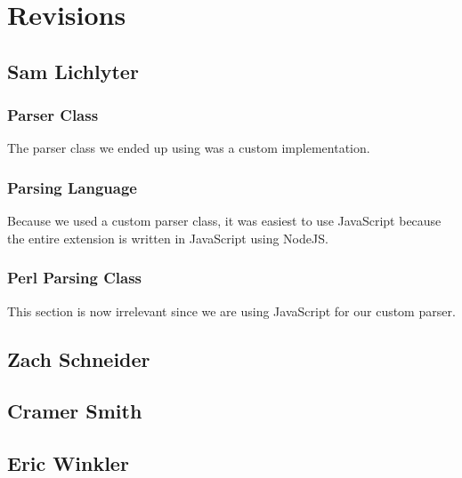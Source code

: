 \documentclass[letterpaper,10pt,titlepage,draftclsnofoot,onecolumn,onesided] {IEEEtran}
\begin{document}
\pagebreak

\section{Revisions}

\subsection{Sam Lichlyter}
\subsubsection{Parser Class}
The parser class we ended up using was a  custom implementation. 

\subsubsection{Parsing Language}
Because we used a custom parser class, it was easiest to use JavaScript because the entire extension is written in JavaScript using NodeJS.

\subsubsection{Perl Parsing Class}
This section is now irrelevant since we are using JavaScript for our custom parser.

\subsection{Zach Schneider}


\subsection{Cramer Smith}


\subsection{Eric Winkler}



\pagebreak


\end{document}

